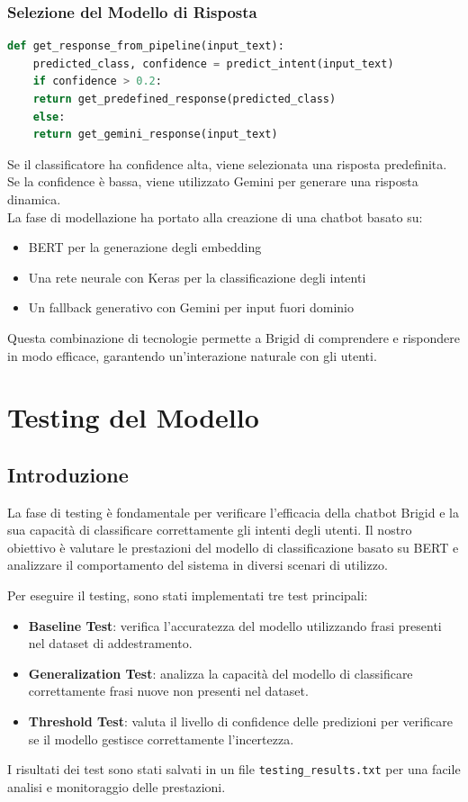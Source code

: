 \documentclass[12pt, letterpaper]{article}
\begin{document}
\subsubsection{Selezione del Modello di Risposta}
\begin{lstlisting}[language=Python]
	def get_response_from_pipeline(input_text):
	predicted_class, confidence = predict_intent(input_text)
	if confidence > 0.2:
	return get_predefined_response(predicted_class)
	else:
	return get_gemini_response(input_text)
\end{lstlisting}
Se il classificatore ha confidence alta, viene selezionata una risposta predefinita. Se la confidence è bassa, viene utilizzato Gemini per generare una risposta dinamica.\\
\newline
La fase di modellazione ha portato alla creazione di una chatbot basato su:
\begin{itemize}
	\item BERT per la generazione degli embedding
	\item Una rete neurale con Keras per la classificazione degli intenti
	\item Un fallback generativo con Gemini per input fuori dominio
\end{itemize}
Questa combinazione di tecnologie permette a Brigid di comprendere e rispondere in modo efficace, garantendo un'interazione naturale con gli utenti.

\newpage
\section{Testing del Modello}

\subsection{Introduzione}
La fase di testing è fondamentale per verificare l'efficacia della chatbot Brigid e la sua capacità di classificare correttamente gli intenti degli utenti. Il nostro obiettivo è valutare le prestazioni del modello di classificazione basato su BERT e analizzare il comportamento del sistema in diversi scenari di utilizzo.

Per eseguire il testing, sono stati implementati tre test principali:
\begin{itemize}
	\item \textbf{Baseline Test}: verifica l'accuratezza del modello utilizzando frasi presenti nel dataset di addestramento.
	\item \textbf{Generalization Test}: analizza la capacità del modello di classificare correttamente frasi nuove non presenti nel dataset.
	\item \textbf{Threshold Test}: valuta il livello di confidence delle predizioni per verificare se il modello gestisce correttamente l'incertezza.
\end{itemize}
I risultati dei test sono stati salvati in un file \texttt{testing\_results.txt} per una facile analisi e monitoraggio delle prestazioni.
\end{document}
